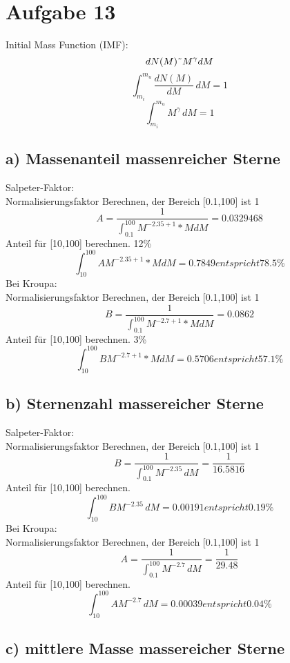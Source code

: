\section{Aufgabe 13}
Initial Mass Function (IMF):
\begin{equation}
dN(M) \symbol{126} M^\gamma dM
\end{equation}
\begin{equation}
\int_{m_i}^{m_u} \frac{dN(M)}{dM} \, dM=1
\end{equation}
\begin{equation}
\int_{m_i}^{m_u} M^\gamma \, dM=1
\end{equation}
\subsection{a) Massenanteil massenreicher Sterne}
Salpeter-Faktor:\\
Normalisierungsfaktor Berechnen, der Bereich [0.1,100] ist 1
\begin{equation}
A=\frac{1}{\int _{0.1}^{100}M^{-2.35+1}*MdM} = 0.0329468
\end{equation}
Anteil für [10,100] berechnen.
12\%
\begin{equation}
\int _{10}^{100}A M^{-2.35+1}*MdM = 0.7849 entspricht 78.5\%
\end{equation}
Bei Kroupa:\\
Normalisierungsfaktor Berechnen, der Bereich [0.1,100] ist 1
\begin{equation}
B=\frac{1}{\int _{0.1}^{100}M^{-2.7+1}*MdM} = 0.0862
\end{equation}
Anteil für [10,100] berechnen.
3\%
\begin{equation}
\int _{10}^{100}B M^{-2.7+1}*MdM = 0.5706 entspricht 57.1\%
\end{equation}
\subsection{b) Sternenzahl massereicher Sterne}

Salpeter-Faktor:\\
Normalisierungsfaktor Berechnen, der Bereich [0.1,100] ist 1
\begin{equation}
B = \frac{1}{\int_{0.1}^{100} M^{-2.35} \, dM} = \frac{1}{16.5816}
\end{equation}
Anteil für [10,100] berechnen.
\begin{equation}
\int_{10}^{100} B M^{-2.35} \, dM = 0.00191 entspricht 0.19\%
\end{equation}
Bei Kroupa:\\
Normalisierungsfaktor Berechnen, der Bereich [0.1,100] ist 1
\begin{equation}
A = \frac{1}{\int_{0.1}^{100} M^{-2.7} \, dM} = \frac{1}{29.48}
\end{equation}
Anteil für [10,100] berechnen.
\begin{equation}
\int_{10}^{100} A M^{-2.7} \, dM = 0.00039 entspricht 0.04\%
\end{equation}
\subsection{c) mittlere Masse massereicher Sterne}
